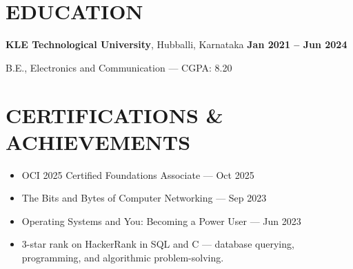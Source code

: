 \documentclass[a4paper,10pt]{extarticle}
\begin{document}
\section*{EDUCATION}
\textbf{KLE Technological University}, Hubballi, Karnataka
\hfill\textbf{Jan 2021 -- Jun 2024}\par
B.E., Electronics and Communication --- CGPA: 8.20\par

\section*{CERTIFICATIONS \& ACHIEVEMENTS}
\begin{itemize}
  \item OCI 2025 Certified Foundations Associate --- Oct 2025
  \item The Bits and Bytes of Computer Networking --- Sep 2023
  \item Operating Systems and You: Becoming a Power User --- Jun 2023
  \item 3-star rank on HackerRank in SQL and C --- database querying,
  programming, and algorithmic problem-solving.
\end{itemize}
\end{document}
